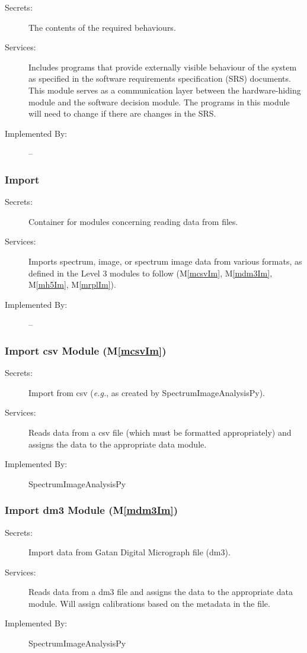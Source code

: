 \documentclass[12pt, titlepage]{article}
\newcommand{\mref}[1]{M\ref{#1}}
\newcommand{\progname}{SpectrumImageAnalysisPy}
\begin{document}
\begin{description}
\item[Secrets:]The contents of the required behaviours.
\item[Services:]Includes programs that provide externally visible behaviour of
  the system as specified in the software requirements specification (SRS)
  documents. This module serves as a communication layer between the
  hardware-hiding module and the software decision module. The programs in this
  module will need to change if there are changes in the SRS.
\item[Implemented By:] --
\end{description}

\subsubsection{Import}
\begin{description}
	\item[Secrets:]Container for modules concerning reading data from files.
	\item[Services:]Imports spectrum, image, or spectrum image data from various formats, as defined in the Level 3 modules to follow (\mref{mcsvIm}, \mref{mdm3Im}, \mref{mh5Im}, \mref{mrplIm}).
	\item[Implemented By:] --
\end{description}

\subsubsection{Import csv Module (\mref{mcsvIm})}
\begin{description}
	\item[Secrets:]Import from csv (\textit{e.g.}, as created by \progname).
	\item[Services:]Reads data from a csv file (which must be formatted appropriately) and assigns the data to the appropriate data module.
	\item[Implemented By:] \progname
\end{description}

\subsubsection{Import dm3 Module (\mref{mdm3Im})}
\begin{description}
	\item[Secrets:]Import data from Gatan Digital Micrograph file (dm3).
	\item[Services:]Reads data from a dm3 file and assigns the data to the appropriate data module. Will assign calibrations based on the metadata in the file.
	\item[Implemented By:] \progname
\end{description}
\end{document}
